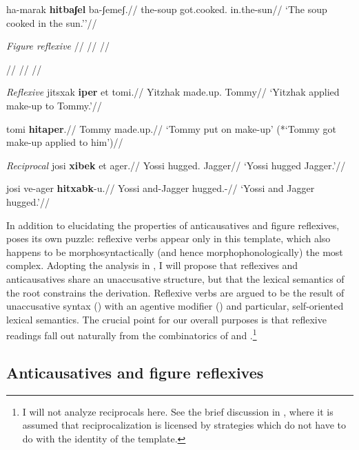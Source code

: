 	\a \begingl
		\gla ha-marak \textbf{hitbaʃel} ba-ʃemeʃ.//
		\glb the-soup got.cooked. in.the-sun//
		\glft `The soup cooked in the sun.''//
	\endgl
\xe

\pex\label{ex:vz:figrefl-va}\textit{Figure reflexive}
	\a \begingl
		\gla //
		\glb //
		\glft //
	\endgl
	
	\a \begingl
		\gla //
		\glb //
		\glft //
	\endgl
\xe

\pex\label{ex:vz:refl-va}\textit{Reflexive}
	\a \begingl
		\gla jitsxak \textbf{iper} et tomi.//
		\glb Yitzhak made.up.  Tommy//
		\glft `Yitzhak applied make-up to Tommy.'//
	\endgl
	
	\a \begingl
		\gla tomi \textbf{hitaper}.//
		\glb Tommy made.up.//
		\glft `Tommy put on make-up' (*`Tommy got make-up applied to him')//
	\endgl
\xe

\pex\label{ex:vz:recip-va}\textit{Reciprocal}
	\a \begingl
		\gla josi \textbf{xibek} et {\textdyoghlig}ager.//
		\glb Yossi hugged.  Jagger//
		\glft `Yossi hugged Jagger.'//
	\endgl
	
	\a \begingl
		\gla josi ve-{\textdyoghlig}ager \textbf{hitxabk}-u.//
		\glb Yossi and-Jagger hugged.-//
		\glft `Yossi and Jagger hugged.'//
	\endgl
\xe

In addition to elucidating the properties of anticausatives and figure reflexives, {\thit} poses its own puzzle: reflexive verbs appear only in this template, which also happens to be morphosyntactically (and hence morphophonologically) the most complex. Adopting the analysis in \cite{kastner17gjgl}, I will propose that reflexives and anticausatives share an unaccusative structure, but that the lexical semantics of the root constrains the derivation. Reflexive verbs are argued to be the result of unaccusative syntax (\vz) with an agentive modifier (\va) and particular, self-oriented lexical semantics. The crucial point for our overall purposes is that reflexive readings fall out naturally from the combinatorics of {\vz} and {\va}.\footnote{I will not analyze reciprocals here. See the brief discussion in \citet[20]{kastner17gjgl}, where it is assumed that reciprocalization is licensed by strategies which do not have to do with the identity of the template.}
	
	\subsection{Anticausatives and figure reflexives} \label{vz:va:easy}
